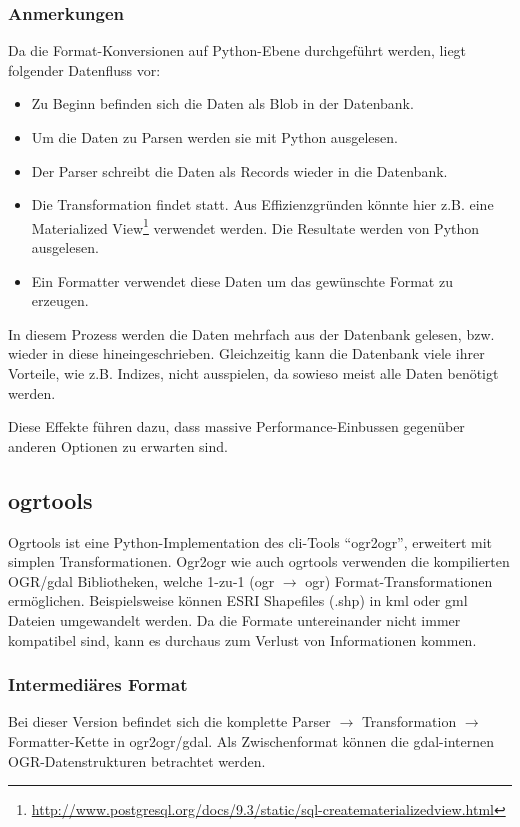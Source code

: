 \subsubsection{Anmerkungen}

Da die Format-Konversionen auf Python-Ebene durchgeführt werden, liegt folgender Datenfluss vor:
\begin{itemize}
\item Zu Beginn befinden sich die Daten als Blob in der Datenbank.
\item Um die Daten zu Parsen werden sie mit Python ausgelesen.
\item Der Parser schreibt die Daten als Records wieder in die Datenbank.
\item Die Transformation findet statt. Aus Effizienzgründen könnte hier z.B. eine Materialized View\footnote{\url{http://www.postgresql.org/docs/9.3/static/sql-creatematerializedview.html}} verwendet werden. Die Resultate werden von Python ausgelesen.
\item Ein Formatter verwendet diese Daten um das gewünschte Format zu erzeugen.
\end{itemize}

In diesem Prozess werden die Daten mehrfach aus der Datenbank gelesen, bzw. wieder in diese hineingeschrieben. Gleichzeitig kann die Datenbank viele ihrer Vorteile, wie z.B. Indizes, nicht ausspielen, da sowieso meist alle Daten benötigt werden.

Diese Effekte führen dazu, dass massive Performance-Einbussen gegenüber anderen Optionen zu erwarten sind.

\subsection{ogrtools}

Ogrtools ist eine Python-Implementation des \acs{cli}-Tools ``ogr2ogr'', erweitert mit simplen Transformationen. Ogr2ogr wie auch ogrtools verwenden die kompilierten OGR/\gls{gdal} Bibliotheken, welche 1-zu-1 (ogr $\to$ ogr) Format-Transformationen ermöglichen. Beispielsweise können ESRI Shapefiles (.shp) in \gls{kml} oder \gls{gml} Dateien umgewandelt werden. Da die Formate untereinander nicht immer kompatibel sind, kann es durchaus zum Verlust von Informationen kommen.

\subsubsection{Intermediäres Format}
Bei dieser Version befindet sich die komplette Parser $\to$ Transformation $\to$ Formatter-Kette in ogr2ogr/\gls{gdal}. Als Zwischenformat können die \gls{gdal}-internen OGR-Datenstrukturen betrachtet werden.

